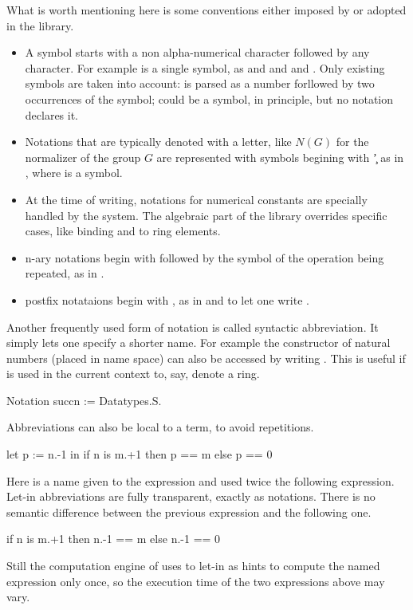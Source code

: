 What is worth mentioning here is some conventions either imposed by \Coq{}
or adopted in the \mcbMC{} library.

\begin{itemize}
\item A symbol starts with a non alpha-numerical character followed by
	any character.  For example  is a single symbol, as
	 and \C{\%/} and \C{<=} and \C{[::}.  Only existing
	symbols are taken into account:  is parsed as a number
	forllowed by two occurrences of the  symbol;  could
	be a symbol, in principle, but no notation declares it.
\item Notations that are typically denoted with a letter, like $N(G)$ for the
	normalizer of the group $G$ are represented with symbols begining
	with \c{'} as in , where  is a symbol.
\item At the time of writing, notations for numerical constants are specially
	handled by the system.  The algebraic part of the library overrides
	specific cases, like binding  and  to ring elements.
\item n-ary notations begin with \C{[} followed by the symbol of the
	operation being repeated, as in .
\item postfix notataions begin with , as in  and 
	to let one write .
\end{itemize}

Another frequently used form of notation is called syntactic abbreviation.
It simply lets one specify a shorter name.  For example the  constructor
of natural numbers (placed in  name space) can also be accessed
by writing .  This is useful if  is used in the current context
to, say, denote a ring.

\begin{coq}{}{}
Notation succn := Datatypes.S.
\end{coq}

Abbreviations can also be local to a term, to avoid repetitions.

\begin{coq}{}{}
let p := n.-1 in
  if n is m.+1 then p == m else p == 0
\end{coq}
Here  is a name given to the expression  and
used twice the following expression.  Let-in abbreviations are
fully transparent, exactly as notations.  There is no semantic
difference between the previous expression and the following one.
\begin{coq}{}{}
  if n is m.+1 then n.-1 == m else n.-1 == 0
\end{coq}
Still the computation engine of \Coq{} uses to let-in as hints
to compute the named expression only once, so the execution time
of the two expressions above may vary.

